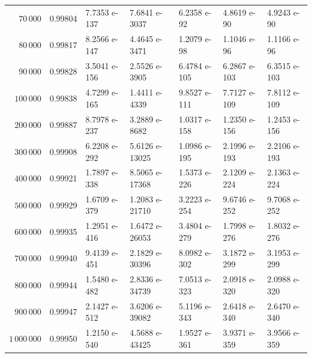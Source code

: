 \documentclass[10pt]{amsart}
\theoremstyle{definition}
\numberwithin{equation}{section}
\begin{document}
\begin{table}[h!]
{\begin{tabular}{|r|c|llll|l|}
$70\,000$ & 0.99804 & 7.7353 e-137 & 7.6841 e-3037 & 6.2358 e-92 & 4.8619 e-90 & 4.9243 e-90 \\
$80\,000$ & 0.99817 & 8.2566 e-147 & 4.4645 e-3471 & 1.2079 e-98 & 1.1046 e-96 & 1.1166 e-96 \\
$90\,000$ & 0.99828 & 3.5041 e-156 & 2.5526 e-3905 & 6.4784 e-105 & 6.2867 e-103 & 6.3515 e-103 \\
$100\,000$ & 0.99838 & 4.7299 e-165 & 1.4411 e-4339 & 9.8527 e-111 & 7.7127 e-109 & 7.8112 e-109 \\
$200\,000$ & 0.99887 & 8.7978 e-237 & 3.2889 e-8682 & 1.0317 e-158 & 1.2350 e-156 & 1.2453 e-156 \\
$300\,000$ & 0.99908 & 6.2208 e-292 & 5.6126 e-13025 & 1.0986 e-195 & 2.1996 e-193 & 2.2106 e-193 \\
$400\,000$ & 0.99921 & 1.7897 e-338 & 8.5065 e-17368 & 1.5373 e-226 & 2.1209 e-224 & 2.1363 e-224 \\
$500\,000$ & 0.99929 & 1.6709 e-379 & 1.2083 e-21710 & 3.2223 e-254 & 9.6746 e-252 & 9.7068 e-252 \\
$600\,000$ & 0.99935 & 1.2951 e-416 & 1.6472 e-26053 & 3.4804 e-279 & 1.7998 e-276 & 1.8032 e-276 \\
$700\,000$ & 0.99940 & 9.4139 e-451 & 2.1829 e-30396 & 8.0982 e-302 & 3.1872 e-299 & 3.1953 e-299 \\
$800\,000$ & 0.99944 & 1.5480 e-482 & 2.8336 e-34739 & 7.0513 e-323 & 2.0918 e-320 & 2.0988 e-320 \\
$900\,000$ & 0.99947 & 2.1427 e-512 & 3.6206 e-39082 & 5.1196 e-343 & 2.6418 e-340 & 2.6470 e-340 \\
$1\,000\,000$ & 0.99950 & 1.2150 e-540 & 4.5688 e-43425 & 1.9527 e-361 & 3.9371 e-359 & 3.9566 e-359 \\

\hline 
\end{tabular}
}
\end{table}
%
\newpage
\end{document}
